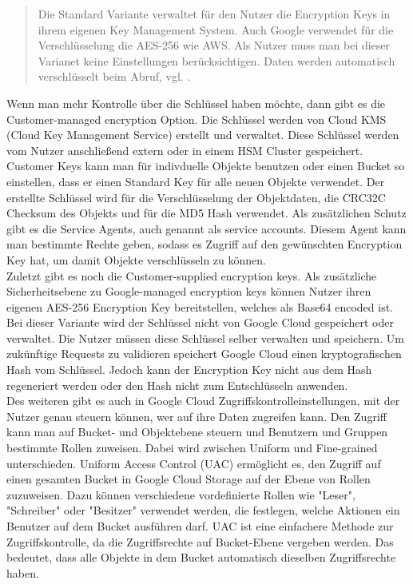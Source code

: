 \begin{quote}
	Die Standard Variante verwaltet für den Nutzer die Encryption Keys in ihrem eigenen Key Management System. Auch Google verwendet für die Verschlüsselung die AES-256 wie AWS. Als Nutzer muss man bei dieser Varianet keine Einstellungen berücksichtigen. Daten werden automatisch verschlüsselt beim Abruf, vgl. \cite{gcp-encrypt}.
\end{quote}

Wenn man mehr Kontrolle über die Schlüssel haben möchte, dann gibt es die Customer-managed encryption Option. Die Schlüssel werden von Cloud KMS (Cloud Key Management Service) erstellt und verwaltet. Diese Schlüssel werden vom Nutzer anschließend extern oder in einem HSM Cluster gespeichert. Customer Keys kann man für indivduelle Objekte benutzen oder einen Bucket so einstellen, dass er einen Standard Key für alle neuen Objekte verwendet. Der erstellte Schlüssel wird für die Verschlüsselung der Objektdaten, die CRC32C Checksum des Objekts und für die MD5 Hash verwendet. Als zusätzlichen Schutz gibt es die Service Agents, auch genannt als service accounts. Diesem Agent kann man bestimmte Rechte geben, sodass es Zugriff auf den gewünschten Encryption Key hat, um damit Objekte verschlüsseln zu können.\\

Zuletzt gibt es noch die Customer-supplied encryption keys. Als zusätzliche Sicherheitsebene zu Google-managed encryption keys können Nutzer ihren eigenen AES-256 Encryption Key bereitstellen, welches als Base64 encoded ist. Bei dieser Variante wird der Schlüssel nicht von Google Cloud gespeichert oder verwaltet. Die Nutzer müssen diese Schlüssel selber verwalten und speichern. Um zukünftige Requests zu validieren speichert Google Cloud einen kryptografischen Hash vom Schlüssel. Jedoch kann der Encryption Key nicht aus dem Hash regeneriert werden oder den Hash nicht zum Entschlüsseln anwenden.\\

Des weiteren gibt es auch in Google Cloud Zugriffskontrolleinstellungen, mit der Nutzer genau steuern können, wer auf ihre Daten zugreifen kann. Den Zugriff kann man auf Bucket- und Objektebene steuern und Benutzern und Gruppen bestimmte Rollen zuweisen. Dabei wird zwischen Uniform und Fine-grained unterschieden. Uniform Access Control (UAC) ermöglicht es, den Zugriff auf einen gesamten Bucket in Google Cloud Storage auf der Ebene von Rollen zuzuweisen. Dazu können verschiedene vordefinierte Rollen wie "Leser", "Schreiber" oder "Besitzer" verwendet werden, die festlegen, welche Aktionen ein Benutzer auf dem Bucket ausführen darf. UAC ist eine einfachere Methode zur Zugriffskontrolle, da die Zugriffsrechte auf Bucket-Ebene vergeben werden. Das bedeutet, dass alle Objekte in dem Bucket automatisch dieselben Zugriffsrechte haben.\\

